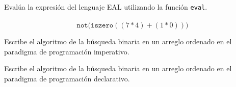 \bigskip

    \begin{exercise}
        Evalúa la expresión del lenguaje \textsf{EAL} utilizando la función \texttt{eval}. \\ \\
            $$\texttt{not(iszero}( (7 * 4) + (1 * 0)))$$
    \end{exercise}

\bigskip

    \begin{exercise}
        Escribe el algoritmo de la búsqueda binaria en un arreglo ordenado en el paradigma de programación imperativo.
    \end{exercise}
\bigskip
    \begin{exercise}
        Escribe el algoritmo de la búsqueda binaria en un arreglo ordenado en el paradigma de programación declarativo.
    \end{exercise}



